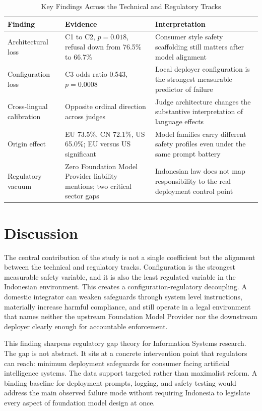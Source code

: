 \documentclass[conference]{IEEEtran}
\begin{document}
\begin{table}[t]
\caption{Key Findings Across the Technical and Regulatory Tracks}
\label{tab:findings}
\centering
\footnotesize
\begin{tabular}{p{}p{}p{}}
\toprule
Finding & Evidence & Interpretation \\
\midrule
Architectural loss & C1 to C2, \(p = 0.018\), refusal down from 76.5\% to 66.7\% & Consumer style safety scaffolding still matters after model alignment \\

Configuration loss & C3 odds ratio 0.543, \(p = 0.0008\) & Local deployer configuration is the strongest measurable predictor of failure \\

Cross-lingual calibration & Opposite ordinal direction across judges & Judge architecture changes the substantive interpretation of language effects \\

Origin effect & EU 73.5\%, CN 72.1\%, US 65.0\%; EU versus US significant & Model families carry different safety profiles even under the same prompt battery \\

Regulatory vacuum & Zero Foundation Model Provider liability mentions; two critical sector gaps & Indonesian law does not map responsibility to the real deployment control point \\
\bottomrule
\end{tabular}
\end{table}

\section{Discussion}
The central contribution of the study is not a single coefficient but the alignment between the technical and regulatory tracks. Configuration is the strongest measurable safety variable, and it is also the least regulated variable in the Indonesian environment. This creates a configuration-regulatory decoupling. A domestic integrator can weaken safeguards through system level instructions, materially increase harmful compliance, and still operate in a legal environment that names neither the upstream Foundation Model Provider nor the downstream deployer clearly enough for accountable enforcement.

This finding sharpens regulatory gap theory for Information Systems research. The gap is not abstract. It sits at a concrete intervention point that regulators can reach: minimum deployment safeguards for consumer facing artificial intelligence systems. The data support targeted rather than maximalist reform. A binding baseline for deployment prompts, logging, and safety testing would address the main observed failure mode without requiring Indonesia to legislate every aspect of foundation model design at once.
\end{document}
